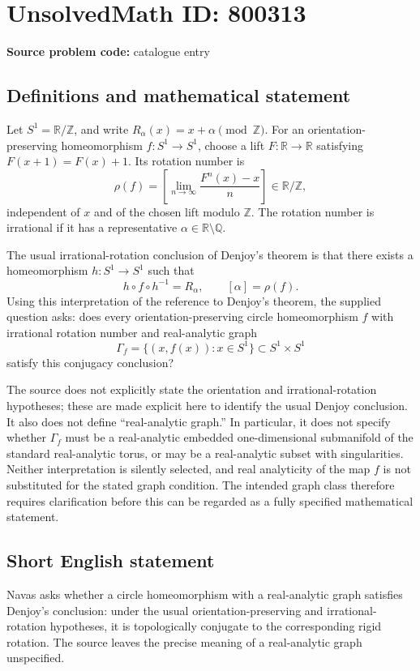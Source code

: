 \documentclass[11pt]{article}
\newcommand{\Z}{\mathbb{Z}}
\newcommand{\Q}{\mathbb{Q}}
\newcommand{\R}{\mathbb{R}}
\begin{document}
\section*{UnsolvedMath ID: 800313}
\textbf{Source problem code:} catalogue entry
\subsection{Definitions and mathematical statement}
Let \(S^1=\R/\Z\), and write \(R_\alpha(x)=x+\alpha\pmod{\Z}\). For an orientation-preserving homeomorphism \(f:S^1\to S^1\), choose a lift \(F:\R\to\R\) satisfying \(F(x+1)=F(x)+1\). Its rotation number is
\[
\rho(f)=\left[\lim_{n\to\infty}\frac{F^n(x)-x}{n}\right]\in\R/\Z,
\]
independent of \(x\) and of the chosen lift modulo \(\Z\). The rotation number is irrational if it has a representative \(\alpha\in\R\setminus\Q\).

The usual irrational-rotation conclusion of Denjoy's theorem is that there exists a homeomorphism \(h:S^1\to S^1\) such that
\[
h\circ f\circ h^{-1}=R_\alpha,
\qquad [\alpha]=\rho(f).
\]
Using this interpretation of the reference to Denjoy's theorem, the supplied question asks: does every orientation-preserving circle homeomorphism \(f\) with irrational rotation number and real-analytic graph
\[
\Gamma_f=\{(x,f(x)):x\in S^1\}\subset S^1\times S^1
\]
satisfy this conjugacy conclusion?

The source does not explicitly state the orientation and irrational-rotation hypotheses; these are made explicit here to identify the usual Denjoy conclusion. It also does not define ``real-analytic graph.'' In particular, it does not specify whether \(\Gamma_f\) must be a real-analytic embedded one-dimensional submanifold of the standard real-analytic torus, or may be a real-analytic subset with singularities. Neither interpretation is silently selected, and real analyticity of the map \(f\) is not substituted for the stated graph condition. The intended graph class therefore requires clarification before this can be regarded as a fully specified mathematical statement.
\subsection{Short English statement}
Navas asks whether a circle homeomorphism with a real-analytic graph satisfies Denjoy's conclusion: under the usual orientation-preserving and irrational-rotation hypotheses, it is topologically conjugate to the corresponding rigid rotation. The source leaves the precise meaning of a real-analytic graph unspecified.
\end{document}
